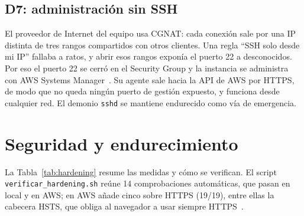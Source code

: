 \documentclass[conference,a4paper]{IEEEtran}
\newcommand{\cod}[1]{\texttt{#1}}
\begin{document}
\subsection{D7: administración sin SSH}
El proveedor de Internet del equipo usa CGNAT: cada conexión sale por una IP distinta de tres rangos compartidos con otros clientes. Una regla ``SSH solo desde mi IP'' fallaba a ratos, y abrir esos rangos exponía el puerto 22 a desconocidos. Por eso el puerto 22 se cerró en el Security Group y la instancia se administra con AWS Systems Manager~\cite{aws-ssm}. Su agente sale hacia la API de AWS por HTTPS, de modo que no queda ningún puerto de gestión expuesto, y funciona desde cualquier red. El demonio \cod{sshd} se mantiene endurecido como vía de emergencia.

\section{Seguridad y endurecimiento}\label{sec:seg}

La Tabla~\ref{tab:hardening} resume las medidas y cómo se verifican. El script \cod{verificar\_hardening.sh} reúne 14 comprobaciones automáticas, que pasan en local y en AWS; en AWS añade cinco sobre HTTPS (19/19), entre ellas la cabecera HSTS, que obliga al navegador a usar siempre HTTPS~\cite{rfc6797}.
\end{document}
